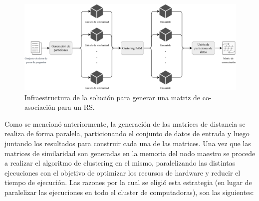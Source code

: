 \begin{figure}[h!]
	\centering
	\includegraphics[width=1\linewidth]{8_problema_investigacion/imagenes/equal_distribuido}
	\caption{Infraestructura de la solución para generar una matriz de co-asociación para un RS.}
	\label{fig:equaldistribuido}
\end{figure}

\bigskip Como se mencionó anteriormente, la generación de las matrices de distancia se realiza de forma paralela, particionando el conjunto de datos de entrada y luego juntando los resultados para construir cada una de las matrices. Una vez que las matrices de similaridad son generadas en la memoria del nodo maestro se procede a realizar el algoritmo de clustering en el mismo, paralelizando las distintas ejecuciones con el objetivo de optimizar los recursos de hardware y reducir el tiempo de ejecución. Las razones por la cual se eligió esta estrategia (en lugar de paralelizar las ejecuciones en todo el cluster de computadoras), son las siguientes:

